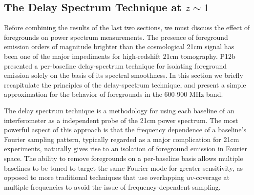 \documentclass[10pt,iop]{emulateapj}
\begin{document}
\subsection{The Delay Spectrum Technique at $z\sim 1$}
\label{sec:dspec}

Before combining the results of the last two sections, we must discuss the effect of
foregrounds on power spectrum measurements.  The presence of foreground emission orders
of magnitude brighter than the cosmological 21cm signal has been one of the major impediments
for high-redshift 21cm tomography.  P12b presented a per-baseline delay-spectrum
technique for isolating foreground emission solely on the basis of its spectral smoothness.
In this section we briefly recapitulate the principles of the delay-spectrum technique, and present
a simple approximation for the behavior of foregrounds in the 600-900 MHz band.

The delay spectrum technique is a methodology for using each baseline of
an interferometer as a independent probe of the 21cm power spectrum.  The most powerful
aspect of this approach is that the frequency dependence of a baseline's Fourier
sampling pattern, typically regarded as a major complication for 21cm experiments,
naturally gives rise to an isolation of foreground emission in Fourier space.  The ability
to remove foregrounds on a per-baseline basis allows multiple baselines to be tuned to
target the same Fourier mode for greater sensitivity, as opposed to more traditional
techniques that use overlapping $uv$-coverage at multiple frequencies to avoid the issue
of frequency-dependent sampling.
\end{document}
